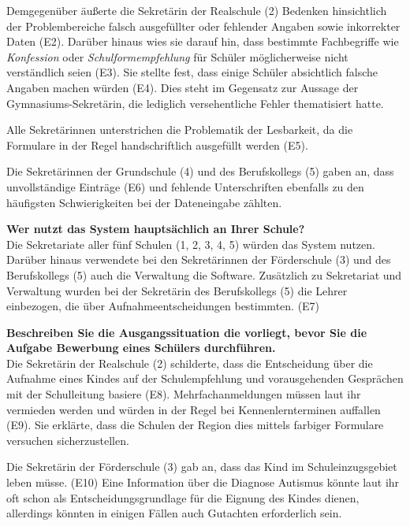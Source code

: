 Demgegenüber äußerte die Sekretärin der Realschule (2) Bedenken hinsichtlich der Problembereiche falsch ausgefüllter oder fehlender Angaben sowie inkorrekter Daten (E2). Darüber hinaus wies sie darauf hin, dass bestimmte Fachbegriffe wie \textit{Konfession} oder \textit{Schulformempfehlung} für Schüler möglicherweise nicht verständlich seien (E3). Sie stellte fest, dass einige Schüler absichtlich falsche Angaben machen würden (E4). Dies steht im Gegensatz zur Aussage der Gymnasiums-Sekretärin, die lediglich versehentliche Fehler thematisiert hatte. 

Alle Sekretärinnen unterstrichen die Problematik der Lesbarkeit, da die Formulare in der Regel handschriftlich ausgefüllt werden (E5).

Die Sekretärinnen der Grundschule (4) und des Berufskollegs (5) gaben an, dass unvollständige Einträge (E6) und fehlende Unterschriften ebenfalls zu den häufigsten Schwierigkeiten bei der Dateneingabe zählten.


\textbf{Wer nutzt das System hauptsächlich an Ihrer Schule?}\\
Die Sekretariate aller fünf Schulen (1, 2, 3, 4, 5) würden das System nutzen. Darüber hinaus verwendete bei den Sekretärinnen der Förderschule (3) und des Berufskollegs (5) auch die Verwaltung die Software. Zusätzlich zu Sekretariat und Verwaltung wurden bei der Sekretärin des Berufskollegs (5) die Lehrer einbezogen, die über Aufnahmeentscheidungen bestimmten. (E7)


\textbf{Beschreiben Sie die Ausgangssituation die vorliegt, bevor Sie die Aufgabe \glqq Bewerbung eines Schülers\grqq{} durchführen.}\\
Die Sekretärin der Realschule (2) schilderte, dass die Entscheidung über die Aufnahme eines Kindes auf der Schulempfehlung und vorausgehenden Gesprächen mit der Schulleitung basiere (E8). Mehrfachanmeldungen müssen laut ihr vermieden werden und würden in der Regel bei Kennenlernterminen auffallen (E9). Sie erklärte, dass die Schulen der Region dies mittels farbiger Formulare versuchen sicherzustellen.

Die Sekretärin der Förderschule (3) gab an, dass das Kind im Schuleinzugsgebiet leben müsse. (E10) Eine Information über die Diagnose Autismus könnte laut ihr oft schon als Entscheidungsgrundlage für die Eignung des Kindes dienen, allerdings könnten in einigen Fällen auch Gutachten erforderlich sein.

